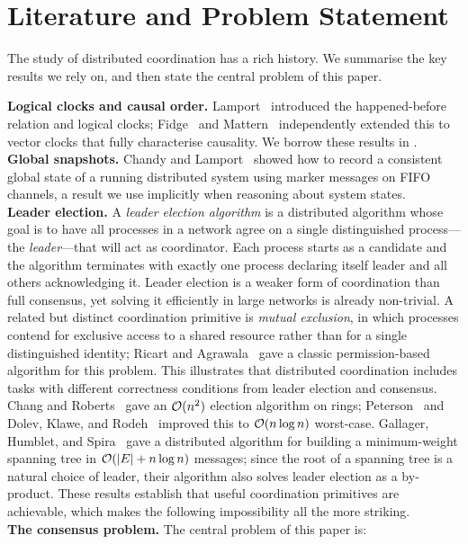 \section{Literature and Problem Statement}\label{sec:literature}

The study of distributed coordination has a rich history. We summarise the key results we rely on, and then state the central problem of this paper.

\textbf{Logical clocks and causal order.} Lamport~\cite{lamport1978} introduced the happened-before relation and logical clocks; Fidge~\cite{fidge1988} and Mattern~\cite{mattern1989} independently extended this to vector clocks that fully characterise causality. We borrow these results in .
\\[6pt]
\textbf{Global snapshots.} Chandy and Lamport~\cite{chandy1985} showed how to record a consistent global state of a running distributed system using marker messages on FIFO channels, a result we use implicitly when reasoning about system states.
\\[6pt]
\textbf{Leader election.} A \emph{leader election algorithm} is a distributed algorithm whose goal is to have all processes in a network agree on a single distinguished process---the \emph{leader}---that will act as coordinator. Each process starts as a candidate and the algorithm terminates with exactly one process declaring itself leader and all others acknowledging it. Leader election is a weaker form of coordination than full consensus, yet solving it efficiently in large networks is already non-trivial. A related but distinct coordination primitive is \emph{mutual exclusion}, in which processes contend for exclusive access to a shared resource rather than for a single distinguished identity; Ricart and Agrawala~\cite{ricartagrawala1981} gave a classic permission-based algorithm for this problem. This illustrates that distributed coordination includes tasks with different correctness conditions from leader election and consensus.
\\[6pt]
Chang and Roberts~\cite{changRoberts1979} gave an $\mathcal{O}(n^2)$ election algorithm on rings; Peterson~\cite{peterson1982} and Dolev, Klawe, and Rodeh~\cite{dolevKlaweRodeh1982} improved this to $\mathcal{O}(n\log n)$ worst-case. Gallager, Humblet, and Spira~\cite{ghs1983} gave a distributed algorithm for building a minimum-weight spanning tree in $\mathcal{O}(|E|+n\log n)$ messages; since the root of a spanning tree is a natural choice of leader, their algorithm also solves leader election as a by-product. These results establish that useful coordination primitives are achievable, which makes the following impossibility all the more striking.
\\[6pt]
\textbf{The consensus problem.} The central problem of this paper is:


